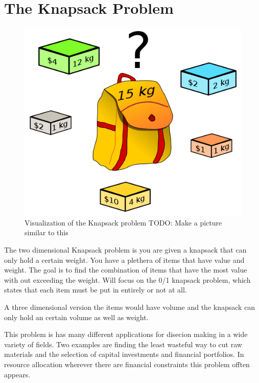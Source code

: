 \label{Ch:Knapsack}


\section*{The Knapsack Problem}


\begin{figure}[H]
\includegraphics[scale = .3]{Knapsack.png}
\caption{Visualization of the Knapsack problem TODO: Make a picture similar to this}
\end{figure}

The two dimensional Knapsack problem is you are given a knapsack that can only hold a certain weight. You have a plethera of items that have value and weight. The goal is to find the combination of items that have the most value with out exceeding the weight. Will focus on the 0/1 knapsack problem, which states that each item must be put in entirely or not at all.

A three dimensional version the items would have volume and the knapsack can only hold an certain volume as well as weight. 

This problem is has many different applications for disecion making in a wide variety of fields. Two examples are finding the least wasteful way to cut raw materials and the selection of capital investments and financial portfolios. In resource allocation wherever there are financial constraints this problem offten appears.  

